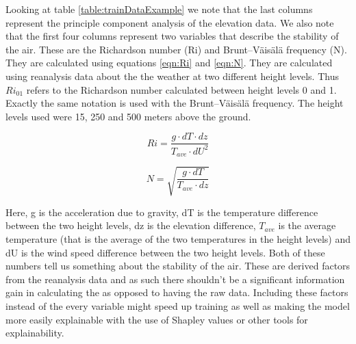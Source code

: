 Looking at table \ref{table:trainDataExample} we note that the last \nPCA columns represent the principle component analysis of the elevation data. We also note that the first four columns represent two variables that describe the stability of the air. These are the Richardson number (Ri) and Brunt–Väisälä frequency (N). They are calculated using equations \ref{eqn:Ri} and \ref{eqn:N}. They are calculated using reanalysis data about the the weather at two different height levels. Thus $Ri_{01}$ refers to the Richardson number calculated between height levels 0 and 1. Exactly the same notation is used with the Brunt–Väisälä frequency. The height levels used were 15, 250 and 500 meters above the ground.

\begin{equation}
    \label{eqn:Ri}
    Ri = \frac{g \cdot dT \cdot dz}{T_{ave} \cdot dU^2}
\end{equation}

\begin{equation}
    \label{eqn:N}
    N = \sqrt{\frac{g \cdot dT }{T_{ave} \cdot dz}}
\end{equation}

Here, g is the acceleration due to gravity, dT is the temperature difference between the two height levels, dz is the elevation difference, $T_{ave}$ is the average temperature (that is the average of the two temperatures in the height levels) and dU is the wind speed difference between the two height levels. Both of these numbers tell us something about the stability of the air. These are derived factors from the reanalysis data and as such there shouldn't be a significant information gain in calculating the as opposed to having the raw data. Including these factors instead of the every variable might speed up training as well as making the model more easily explainable with the use of Shapley values or other tools for explainability.

